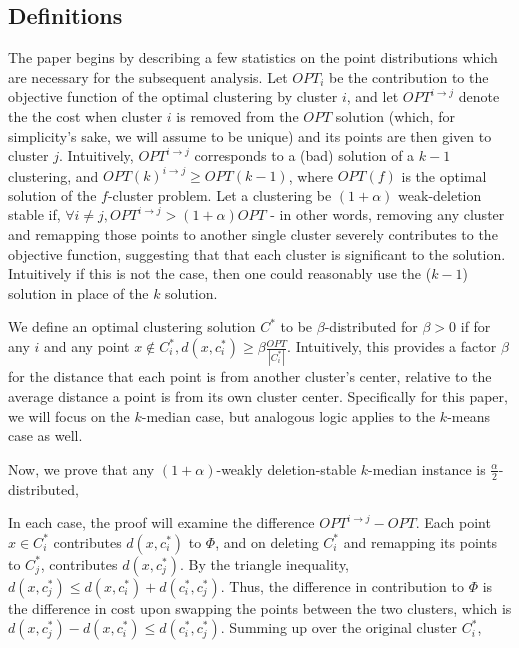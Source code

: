 \documentclass[paper=a4, fontsize=10.5pt]{scrartcl} %
\numberwithin{equation}{section} %
\numberwithin{figure}{section} %
\numberwithin{table}{section} %
\begin{document}
\subsection{Definitions}
The paper begins by describing a few statistics on the point distributions which are necessary for the subsequent analysis.  Let $OPT_i$ be the contribution to the objective function of the optimal clustering by cluster $i$, and let $OPT^{i \rightarrow j}$ denote the the cost when cluster $i$ is removed from the $OPT$ solution (which, for simplicity's sake, we will assume to be unique) and its points are then given to cluster $j$.  Intuitively, $OPT^{i \rightarrow j}$ corresponds to a (bad) solution of a $k-1$ clustering, and $OPT(k)^{i \rightarrow j} \geq OPT(k-1)$, where $OPT(f)$ is the optimal solution of the $f$-cluster problem.  Let a clustering be $(1 + \alpha)$ weak-deletion stable if, $\forall i \neq j, OPT^{i \rightarrow j} > (1 + \alpha)OPT$ - in other words, removing any cluster and remapping those points to another single cluster severely contributes to the objective function, suggesting that that each cluster is significant to the solution. Intuitively if this is not the case, then one could reasonably use the ($k-1$) solution in place of the $k$ solution.

  We define an optimal clustering solution $C^*$ to be $\beta$-distributed for $\beta > 0$ if for any $i$ and any point $x \notin C^*_i, d(x, c^*_i) \geq \beta \frac{OPT}{|C^*_i|}$. Intuitively, this provides a factor $\beta$ for the distance that each point is from another cluster's center, relative to the average distance a point is from its own cluster center. Specifically for this paper, we will focus on the $k$-median case, but analogous logic applies to the $k$-means case as well.   

Now, we prove that any $(1+\alpha)$-weakly deletion-stable $k$-median instance is $\frac{\alpha}{2}$-distributed,


In each case, the proof will examine the difference $OPT^{i \rightarrow j} - OPT$.  Each point $x \in C^*_i$ contributes $d(x, c^*_i)$ to $\Phi$, and on deleting $C^*_i$ and remapping its points to $C^*_j$, contributes $d(x, c^*_j)$.  By the triangle inequality, $d(x, c^*_j) \leq d(x, c^*_i) + d(c^*_i, c^*_j)$. Thus, the difference in contribution to $\Phi$ is the difference in cost upon swapping the points between the two clusters, which is $ d(x, c^*_j)  - d(x, c^*_i) \leq d(c^*_i, c^*_j)$.  Summing up over the original cluster $C^*_i$,
\end{document}
